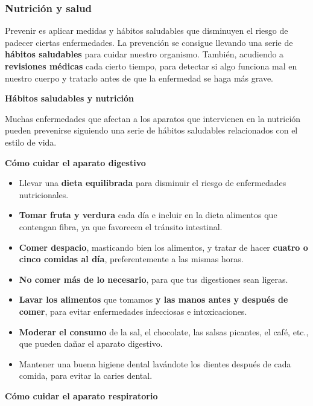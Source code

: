 \subsubsection{Nutrición y salud}

Prevenir es aplicar medidas y hábitos saludables que disminuyen el riesgo de padecer ciertas enfermedades. La prevención se consigue llevando una serie de \textbf{hábitos saludables} para cuidar nuestro organismo. También, acudiendo a \textbf{revisiones médicas} cada cierto tiempo, para detectar si algo funciona mal en nuestro cuerpo y tratarlo antes de que la enfermedad se haga más grave.

\vspace{3mm}
\textbf{Hábitos saludables y nutrición}

\vspace{3mm}
Muchas enfermedades que afectan a los aparatos que intervienen en la nutrición pueden prevenirse siguiendo una serie de hábitos saludables relacionados con el estilo de vida.

\vspace{3mm}
\textbf{Cómo cuidar el aparato digestivo}

\begin{itemize}
    \item Llevar una \textbf{dieta equilibrada} para disminuir el riesgo de enfermedades nutricionales.
    \item \textbf{Tomar fruta y verdura} cada día e incluir en la dieta alimentos que contengan fibra, ya que favorecen el tránsito intestinal.
    \item \textbf{Comer despacio}, masticando bien los alimentos, y tratar de hacer \textbf{cuatro o cinco comidas al día}, preferentemente a las mismas horas.
    \item \textbf{No comer más de lo necesario}, para que tus digestiones sean ligeras.
    \item \textbf{Lavar los alimentos} que tomamos \textbf{y las manos antes y después de comer}, para evitar enfermedades infecciosas e intoxicaciones.
    \item \textbf{Moderar el consumo} de la sal, el chocolate, las salsas picantes, el café, etc., que pueden dañar el aparato digestivo.
    \item Mantener una buena higiene dental lavándote los dientes después de cada comida, para evitar la caries dental.
\end{itemize}

\textbf{Cómo cuidar el aparato respiratorio}

